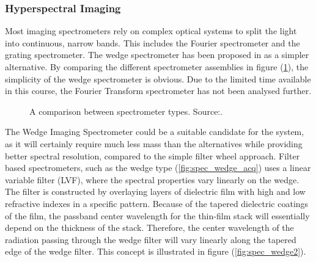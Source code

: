 \subsubsection*{Hyperspectral Imaging}
Most imaging spectrometers rely on complex optical systems to split the light into continuous, narrow bands. This includes the Fourier spectrometer and the grating spectrometer. The wedge spectrometer has been proposed in \cite{puschell1999a} as a simpler alternative. By comparing the different spectrometer assemblies in figure (\ref{fig:spec_compare}), the simplicity of the wedge spectrometer is obvious. Due to the limited time available in this course, the Fourier Transform spectrometer has not been analysed further.
\begin{figure}[htb]
    \centering
    \captionsetup[subfigure]{width=0.25\textwidth}
    \caption{A comparison between spectrometer types. Source:\cite{puschell1999a}.}\label{fig:spec_compare}
\end{figure}
The Wedge Imaging Spectrometer could be a suitable candidate for the system, as it will certainly require much less mass than the alternatives while providing better spectral resolution, compared to the simple filter wheel approach. Filter based spectrometers, such as the wedge type (\ref{fig:spec_wedge_acq}) uses a linear variable filter (LVF), where the spectral properties vary linearly on the wedge\cite{joseph2015building}. The filter is constructed by overlaying layers of dielectric film with high and low refractive indexes in a specific pattern. Because of the tapered dielectric coatings of the film, the passband center wavelength for the thin-film stack will essentially depend on the thickness of the stack. Therefore, the center wavelength of the radiation passing through the wedge filter will vary linearly along the tapered edge of the wedge filter\cite{joseph2015building}. This concept is illustrated in figure (\ref{fig:spec_wedge2}).
